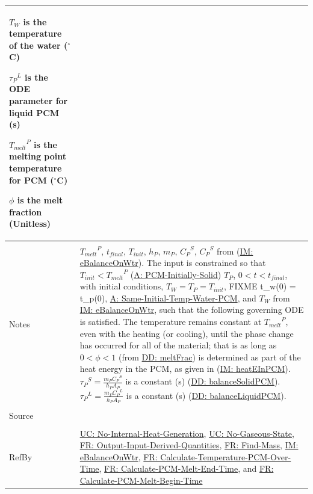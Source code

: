 \documentclass[12pt]{article}
\begin{document}
\begin{minipage}{\textwidth}
\begin{tabular}{p{} p{}}
\begin{symbDescription}
              \item{${T_{W}}$ is the temperature of the water (${}^{\circ}$C)}
              \item{${{τ_{P}}^{L}}$ is the ODE parameter for liquid PCM (s)}
              \item{${{T_{melt}}^{P}}$ is the melting point temperature for PCM (${}^{\circ}$C)}
              \item{$ϕ$ is the melt fraction (Unitless)}
              \end{symbDescription}
\\ \midrule \\
Notes & ${{T_{melt}}^{P}}$, ${t_{final}}$, ${T_{init}}$, ${h_{P}}$, ${m_{P}}$, ${{C_{P}}^{S}}$, ${{C_{P}}^{S}}$ from (\hyperref[IM:eBalanceOnWtr]{IM: eBalanceOnWtr}). The input is constrained so that ${T_{init}}<{{T_{melt}}^{P}}$ (\hyperref[assumpPIS]{A: PCM-Initially-Solid}) ${T_{P}}$, $0<t<{t_{final}}$, with initial conditions, ${T_{W}}={T_{P}}={T_{init}}$, FIXME t\_w(0) = t\_p(0), \hyperref[assumpSITWP]{A: Same-Initial-Temp-Water-PCM}, and ${T_{W}}$ from \hyperref[IM:eBalanceOnWtr]{IM: eBalanceOnWtr}, such that the following governing ODE is satisfied. The temperature remains constant at ${{T_{melt}}^{P}}$, even with the heating (or cooling), until the phase change has occurred for all of the material; that is as long as $0<ϕ<1$ (from \hyperref[DD:meltFrac]{DD: meltFrac}) is determined as part of the heat energy in the PCM, as given in (\hyperref[IM:heatEInPCM]{IM: heatEInPCM}). ${{τ_{P}}^{S}}=\frac{{m_{P}} {{C_{P}}^{S}}}{{h_{P}} {A_{P}}}$ is a constant (s) (\hyperref[DD:balanceSolidPCM]{DD: balanceSolidPCM}). ${{τ_{P}}^{L}}=\frac{{m_{P}} {{C_{P}}^{L}}}{{h_{P}} {A_{P}}}$ is a constant (s) (\hyperref[DD:balanceLiquidPCM]{DD: balanceLiquidPCM}).
\\ \midrule \\
Source & \cite{koothoor2013}
\\ \midrule \\
RefBy & \hyperref[unlikeChgNIHG]{UC: No-Internal-Heat-Generation}, \hyperref[unlikeChgNGS]{UC: No-Gaseous-State}, \hyperref[outputInputDerivQuants]{FR: Output-Input-Derived-Quantities}, \hyperref[findMass]{FR: Find-Mass}, \hyperref[IM:eBalanceOnWtr]{IM: eBalanceOnWtr}, \hyperref[calcTempPCMOverTime]{FR: Calculate-Temperature-PCM-Over-Time}, \hyperref[calcPCMMeltEnd]{FR: Calculate-PCM-Melt-End-Time}, and \hyperref[calcPCMMeltBegin]{FR: Calculate-PCM-Melt-Begin-Time}
\\ \bottomrule \end{tabular}
\end{minipage}
\end{document}
